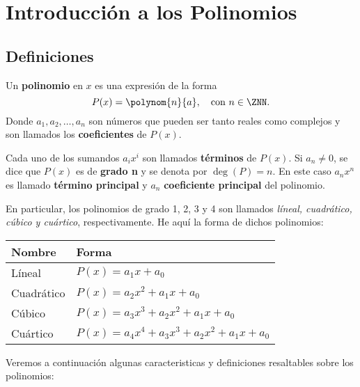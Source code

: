 \newpage
\section{Introducción a los Polinomios}



\subsection{Definiciones}

\begin{section-definition.tcb}
    Un \textbf{polinomio} en $x$ es una expresión de la forma
    \[
        P(x) = \polynom{n}{a},\quad \text{con} \ n \in \ZNN.
    \]
    Donde $a_1, a_2, \dots, a_n$ son números que pueden ser tanto reales como complejos y son llamados los \textbf{coeficientes} de $P(x)$.
\end{section-definition.tcb}

Cada uno de los sumandos $a_i x^i$ son llamados \textbf{términos} de $P(x)$.
Si $a_n \neq 0$, se dice que $P(x)$ es de \textbf{grado n} y se denota por $\deg{(P)} = n$.
En este caso $a_n x^n$ es llamado \textbf{término principal} y $a_n$ \textbf{coeficiente principal} del polinomio.

En particular, los polinomios de grado 1, 2, 3 y 4 son llamados \emph{líneal, cuadrático, cúbico y cuártico}, respectivamente.
He aquí la forma de dichos polinomios:

\begin{table}[H]
    \centering
    \begin{tabular}{p{2.5cm} p{6.5cm}}
        \hline
        Nombre & Forma \\
        \hline \hline
        Líneal & $P(x) = a_1 x + a_0$\\
        Cuadrático & $P(x) = a_2 x^2 + a_1 x + a_0$\\
        Cúbico & $P(x) = a_3 x^3 + a_2 x^2 + a_1 x + a_0$\\
        Cuártico & $P(x) = a_4 x^4 + a_3 x^3 + a_2 x^2 + a_1 x + a_0$\\
        \hline
    \end{tabular}
\end{table}

Veremos a continuación algunas caracteristicas y definiciones resaltables sobre los polinomios:

